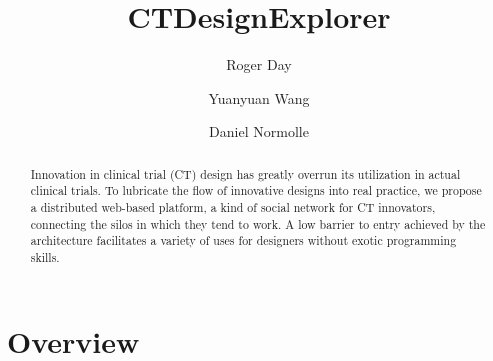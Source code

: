 \documentclass[12pt]{amsart}
\let\origmaketitle\maketitle
\def\maketitle{
  \begingroup
  \def\uppercasenonmath##1{} %
  \let\MakeUppercase\relax %
  \origmaketitle
  \endgroup
}
\begin{document}
\title{CTDesignExplorer}
\author{Roger Day}
\author{Yuanyuan Wang}
\author{Daniel Normolle}



\date{} 

\begin{abstract}
Innovation in clinical trial (CT) design has greatly overrun its utilization in actual clinical trials. To lubricate the flow of innovative designs into real practice, we propose a distributed web-based platform, a kind of social network for CT innovators, connecting the silos in which they tend to work.
A low barrier to entry achieved by the architecture facilitates a variety of uses for designers without exotic programming skills.  
\end{abstract}


\maketitle


\section{Overview}
\end{document}
